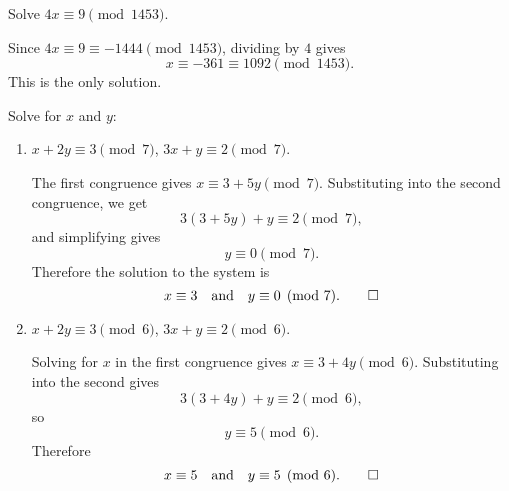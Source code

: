  Solve $4x\equiv9\pmod{1453}$.
\begin{solution}
  Since $4x\equiv9\equiv-1444\pmod{1453}$, dividing by $4$ gives
  \begin{equation*}
    x\equiv-361\equiv1092\pmod{1453}.
  \end{equation*}
  This is the only solution.
\end{solution}

 Solve for $x$ and $y$:
\begin{enumerate}
\item $x + 2y \equiv 3\pmod7$, $3x + y\equiv2\pmod7$.
  \begin{solution}
    The first congruence gives $x\equiv3 + 5y\pmod7$. Substituting
    into the second congruence, we get
    \begin{equation*}
      3(3 + 5y) + y\equiv2\pmod7,
    \end{equation*}
    and simplifying gives
    \begin{equation*}
      y\equiv0\pmod7.
    \end{equation*}
    Therefore the solution to the system is
    \begin{equation*}
      x\equiv3 \quad\text{and}\quad y\equiv0\pmod7. \qedhere
    \end{equation*}
  \end{solution}
\item $x + 2y \equiv 3\pmod6$, $3x + y\equiv2\pmod6$.
  \begin{solution}
    Solving for $x$ in the first congruence gives
    $x\equiv3 + 4y\pmod6$. Substituting into the second gives
    \begin{equation*}
      3(3 + 4y) + y\equiv2\pmod6,
    \end{equation*}
    so
    \begin{equation*}
      y\equiv5\pmod6.
    \end{equation*}
    Therefore
    \begin{equation*}
      x\equiv5 \quad\text{and}\quad y\equiv5\pmod6. \qedhere
    \end{equation*}
  \end{solution}
\end{enumerate}

